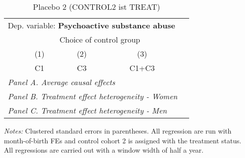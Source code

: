  \begin{table}[H] \centering \begin{threeparttable} \caption{Placebo 2 (CONTROL2 ist TREAT) } {\def\sym#1{\ifmmode^{#1}\else\(^{#1}\)\fi} \begin{tabular}{l*{4}{c}} \toprule \multicolumn{4}{l}{Dep. variable: \textbf{Psychoactive substance abuse}} \\ & \multicolumn{3}{c}{Choice of control group} \\ \cmidrule(lr){2-4}
            &\multicolumn{1}{c}{(1)}&\multicolumn{1}{c}{(2)}&\multicolumn{1}{c}{(3)}\\
            &\multicolumn{1}{c}{C1}&\multicolumn{1}{c}{C3}&\multicolumn{1}{c}{C1+C3}\\
\midrule
 \multicolumn{4}{l}{\emph{Panel A. Average causal effects}} \\      \midrule\multicolumn{4}{l}{\emph{Panel B. Treatment effect heterogeneity - Women}} \\      \midrule\multicolumn{4}{l}{\emph{Panel C. Treatment effect heterogeneity - Men}} \\      
\bottomrule \end{tabular} } \begin{tablenotes} \item \scriptsize \emph{Notes:} Clustered standard errors in parentheses. All regression are run with month-of-birth FEs and control cohort 2 is assigned with the treatment status. All regressions are carried out with a window width of half a year. \end{tablenotes} \end{threeparttable} \end{table} 
